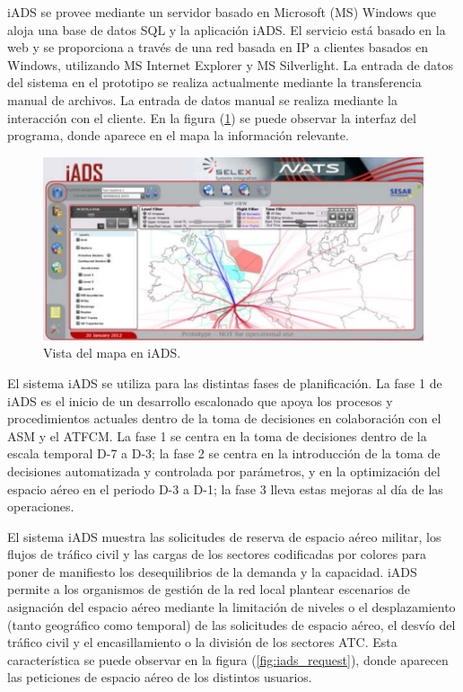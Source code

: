iADS se provee mediante un servidor basado en Microsoft (MS) Windows que aloja una base de datos SQL y la aplicación iADS. El servicio está basado en la web y se proporciona a través de una red basada en IP a clientes basados en Windows, utilizando MS Internet Explorer y MS Silverlight. La entrada de datos del sistema en el prototipo se realiza actualmente mediante la transferencia manual de archivos. La entrada de datos manual se realiza mediante la interacción con el cliente. En la figura (\ref{fig:iads_map}) se puede observar la interfaz del programa, donde aparece en el mapa la información relevante.

\begin{figure}[H]
    \centering
    \includegraphics[width=1\linewidth]{figuras/iads_map.png}
    \caption{Vista del mapa en iADS.}
    \label{fig:iads_map}
\end{figure}

El sistema iADS se utiliza para las distintas fases de planificación. La fase 1 de iADS es el inicio de un desarrollo escalonado que apoya los procesos y procedimientos actuales dentro de la toma de decisiones en colaboración con el ASM y el ATFCM. La fase 1 se centra en la toma de decisiones dentro de la escala temporal D-7 a D-3; la fase 2 se centra en la introducción de la toma de decisiones automatizada y controlada por parámetros, y en la optimización del espacio aéreo en el periodo D-3 a D-1; la fase 3 lleva estas mejoras al día de las operaciones. 

El sistema iADS muestra las solicitudes de reserva de espacio aéreo militar, los flujos de tráfico civil y las cargas de los sectores codificadas por colores para poner de manifiesto los desequilibrios de la demanda y la capacidad. iADS permite a los organismos de gestión de la red local plantear escenarios de asignación del espacio aéreo mediante la limitación de niveles o el desplazamiento (tanto geográfico como temporal) de las solicitudes de espacio aéreo, el desvío del tráfico civil y el encasillamiento o la división de los sectores ATC. Esta característica se puede observar en la figura (\ref{fig:iads_request}), donde aparecen las peticiones de espacio aéreo de los distintos usuarios.


